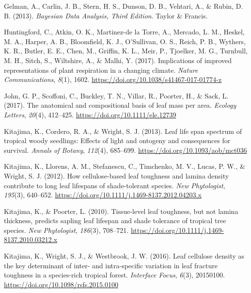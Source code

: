 \documentclass[
  12pt,
  a4paper,
,tablecaptionabove
]{scrartcl}
\newlength{\cslhangindent}
\newenvironment{CSLReferences}[2] %
 {%
  \setlength{\parindent}{0pt}
  \ifodd #1 \everypar{\setlength{\hangindent}{\cslhangindent}}\ignorespaces\fi
  \ifnum #2 > 0
  \setlength{\parskip}{#2\baselineskip}
  \fi
 }%
 {}
\begin{document}
\begin{CSLReferences}{1}{0}
\leavevmode{}%
Gelman, A., Carlin, J. B., Stern, H. S., Dunson, D. B., Vehtari, A., \&
Rubin, D. B. (2013). \emph{Bayesian {Data Analysis}, {Third Edition}}.
{Taylor \& Francis}.

\leavevmode{}%
Huntingford, C., Atkin, O. K., Martinez-de la Torre, A., Mercado, L. M.,
Heskel, M. A., Harper, A. B., Bloomfield, K. J., O'Sullivan, O. S.,
Reich, P. B., Wythers, K. R., Butler, E. E., Chen, M., Griffin, K. L.,
Meir, P., Tjoelker, M. G., Turnbull, M. H., Sitch, S., Wiltshire, A., \&
Malhi, Y. (2017). Implications of improved representations of plant
respiration in a changing climate. \emph{Nature Communications},
\emph{8}(1), 1602. \url{https://doi.org/10.1038/s41467-017-01774-z}

\leavevmode{}%
John, G. P., Scoffoni, C., Buckley, T. N., Villar, R., Poorter, H., \&
Sack, L. (2017). The anatomical and compositional basis of leaf mass per
area. \emph{Ecology Letters}, \emph{20}(4), 412--425.
\url{https://doi.org/10.1111/ele.12739}

\leavevmode{}%
Kitajima, K., Cordero, R. A., \& Wright, S. J. (2013). Leaf life span
spectrum of tropical woody seedlings: {Effects} of light and ontogeny
and consequences for survival. \emph{Annals of Botany}, \emph{112}(4),
685--699. \url{https://doi.org/10.1093/aob/mct036}

\leavevmode{}%
Kitajima, K., Llorens, A. M., Stefanescu, C., Timchenko, M. V., Lucas,
P. W., \& Wright, S. J. (2012). How cellulose-based leaf toughness and
lamina density contribute to long leaf lifespans of shade-tolerant
species. \emph{New Phytologist}, \emph{195}(3), 640--652.
\url{https://doi.org/10.1111/j.1469-8137.2012.04203.x}

\leavevmode{}%
Kitajima, K., \& Poorter, L. (2010). Tissue-level leaf toughness, but
not lamina thickness, predicts sapling leaf lifespan and shade tolerance
of tropical tree species. \emph{New Phytologist}, \emph{186}(3),
708--721. \url{https://doi.org/10.1111/j.1469-8137.2010.03212.x}

\leavevmode{}%
Kitajima, K., Wright, S. J., \& Westbrook, J. W. (2016). Leaf cellulose
density as the key determinant of inter- and intra-specific variation in
leaf fracture toughness in a species-rich tropical forest.
\emph{Interface Focus}, \emph{6}(3), 20150100.
\url{https://doi.org/10.1098/rsfs.2015.0100}


\end{CSLReferences}
\end{document}
